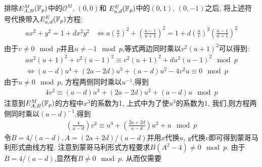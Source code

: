 排除$E_{A,B}^M(\mathbb{F}_p)$中的$\mathcal{O}^M$, $(0,0)$和
$E_{a,d}^E(\mathbb{F}_p)$中的$(0,1)$, $(0,-1)$之后, 将上述符号代换带入$E_{a,d}^E(\mathbb{F}_p)$方程:
\begin{equation*}
\begin{array}{rl}
ax^2 + y^2 = 1 + dx^2y^2 & \iff  a\left(\frac{u}{v}\right)^2 + \left(\frac{u-1}{u+1}\right)^2 = 1 + d\left(\frac{u}{v}\right)^2\left(\frac{u-1}{u+1}\right)^2\\
\end{array}
\end{equation*}
由于$v \neq 0 \mod p$并且$u\neq -1 \mod p$,等式两边同时乘以$v^2(u+1)^2$可以得到:
\begin{equation*}
\begin{array}{rl}
au^2(u+1)^2 + v^2(u-1)^2 \equiv v^2(u+1)^2 + du^2(u-1)^2 \mod p\\
\iff  (a-d)u^4 + (2a-2d)u^3 + (a-d)u^2 - 4v^2u \equiv 0 \mod p
\end{array}
\end{equation*}
由于$u\neq 0\mod p$, 方程两侧同时乘以$u^{-1}$,得到
\begin{equation*}
\begin{array}{rl}
4v^2 \equiv (a-d)u^3 + (2a-2d)u^2 + (a-d)u \mod p
\end{array}
\end{equation*}
注意到$E_{A,B}^M(\mathbb{F}_p)$的方程中$x^3$的系数为1, 上式中为了使$u^3$的系数为1,
我们,则方程两侧同时乘以$(a-d)^{-1}$,得到
\begin{equation*}
\begin{array}{rl}
\left(\frac{4}{a-d}\right)v^2 \equiv u^3 + \left(\frac{2a+2d}{a-d}\right)u^2 + u \mod p
\end{array}
\end{equation*}
令$B = 4/(a-d), A = (2a+2d)/(a-d)$并用$x$代换$u$, $y$代换$v$即可得到蒙哥马利形式曲线方程.
注意到蒙哥马利形式方程要求$B(A^2-4)\neq 0 \mod p$.
由于$B = 4/(a-d)$,显然有$B\neq0\mod p$.
从而仅需要

